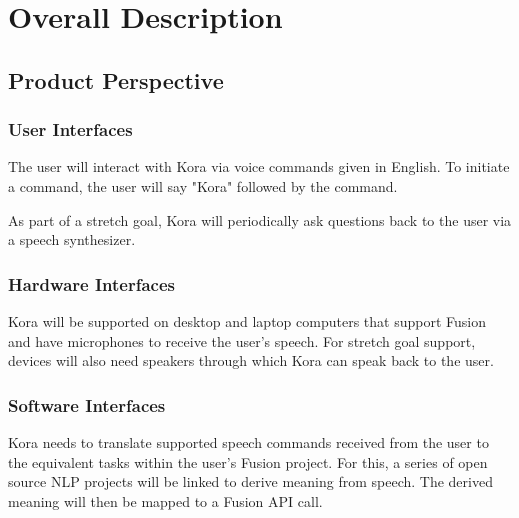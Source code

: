 \documentclass[onecolumn, draftclsnofoot,10pt, compsoc]{IEEEtran}
\def \botname{Kora\xspace}
\begin{document}
\section{Overall Description}
    \subsection{Product Perspective}

        \subsubsection{User Interfaces}
            The user will interact with \botname via voice commands given in English. 
            To initiate a command, the user will say "\botname" followed by the command. 

            As part of a stretch goal, \botname will periodically ask questions back to the user via a speech synthesizer.

        \subsubsection{Hardware Interfaces} 
            \botname will be supported on desktop and laptop computers that support Fusion and have microphones to receive the user's speech.
            For stretch goal support, devices will also need speakers through which \botname can speak back to the user.

        \subsubsection{Software Interfaces}               
            \botname needs to translate supported speech commands received from the user to the equivalent tasks within the user's Fusion project.
            For this, a series of open source NLP projects will be linked to derive meaning from speech.
            The derived meaning will then be mapped to a Fusion API call.
\end{document}
